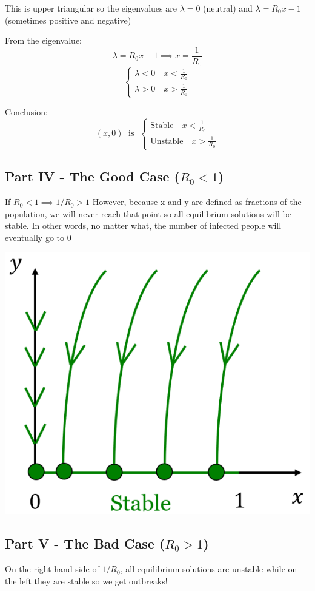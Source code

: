\documentclass[12pt]{article}
\begin{document}
This is upper triangular so the eigenvalues are $\lambda = 0$ (neutral) and $\lambda = R_0 x - 1$ (sometimes positive and negative)

From the eigenvalue:
\[\lambda = R_0 x - 1 \implies x = \frac{1}{R_0}\]
\[\begin{cases}
    \lambda < 0 \quad x < \frac{1}{R_0}\\
    \lambda > 0 \quad x > \frac{1}{R_0}
\end{cases}\]

Conclusion:
\[(x, 0) \; \text{ is } \; \begin{cases}
    \text{Stable} \quad x < \frac{1}{R_0}\\
    \text{Unstable} \quad x > \frac{1}{R_0}
\end{cases}\]

\subsection*{Part IV - The Good Case ($R_0 < 1$)}
If $R_0 < 1 \implies 1/R_0 > 1$
However, because x and y are defined as fractions of the population, we will never reach that point so all equilibrium solutions will be stable. 
In other words, no matter what, the number of infected people will eventually go to 0

\includegraphics{Images/sir stability.png}

\subsection*{Part V - The Bad Case ($R_0 > 1$)}
On the right hand side of $1/R_0$, all equilibrium solutions are unstable while on the left they are stable so we get outbreaks!
\end{document}
